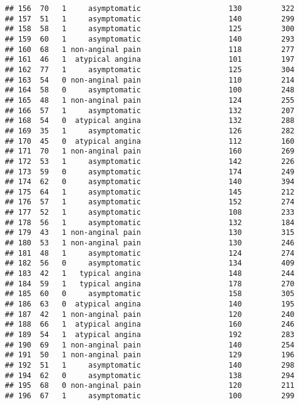\documentclass[]{article}
\begin{document}
\begin{verbatim}
## 156  70   1     asymptomatic                    130         322
## 157  51   1     asymptomatic                    140         299
## 158  58   1     asymptomatic                    125         300
## 159  60   1     asymptomatic                    140         293
## 160  68   1 non-anginal pain                    118         277
## 161  46   1  atypical angina                    101         197
## 162  77   1     asymptomatic                    125         304
## 163  54   0 non-anginal pain                    110         214
## 164  58   0     asymptomatic                    100         248
## 165  48   1 non-anginal pain                    124         255
## 166  57   1     asymptomatic                    132         207
## 168  54   0  atypical angina                    132         288
## 169  35   1     asymptomatic                    126         282
## 170  45   0  atypical angina                    112         160
## 171  70   1 non-anginal pain                    160         269
## 172  53   1     asymptomatic                    142         226
## 173  59   0     asymptomatic                    174         249
## 174  62   0     asymptomatic                    140         394
## 175  64   1     asymptomatic                    145         212
## 176  57   1     asymptomatic                    152         274
## 177  52   1     asymptomatic                    108         233
## 178  56   1     asymptomatic                    132         184
## 179  43   1 non-anginal pain                    130         315
## 180  53   1 non-anginal pain                    130         246
## 181  48   1     asymptomatic                    124         274
## 182  56   0     asymptomatic                    134         409
## 183  42   1   typical angina                    148         244
## 184  59   1   typical angina                    178         270
## 185  60   0     asymptomatic                    158         305
## 186  63   0  atypical angina                    140         195
## 187  42   1 non-anginal pain                    120         240
## 188  66   1  atypical angina                    160         246
## 189  54   1  atypical angina                    192         283
## 190  69   1 non-anginal pain                    140         254
## 191  50   1 non-anginal pain                    129         196
## 192  51   1     asymptomatic                    140         298
## 194  62   0     asymptomatic                    138         294
## 195  68   0 non-anginal pain                    120         211
## 196  67   1     asymptomatic                    100         299

\end{verbatim}
\end{document}
